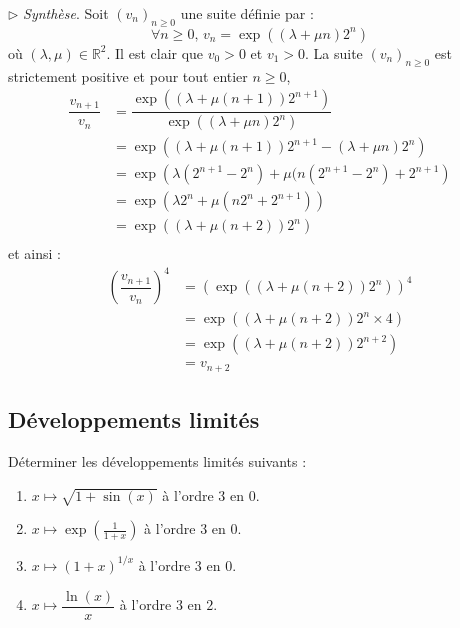 \documentclass[a4paper,twoside,french,10pt]{VcCours}
\begin{document}
\medskip

\noindent $\rhd$ \textit{Synthèse}. Soit $(v_n)_{n \geq 0}$ une suite définie par :
$$ \forall n \geq 0, \, v_n = \exp((\lambda+ \mu n)2^n)$$
où $(\lambda, \mu) \in \mathbb{R}^2$. Il est clair que $v_0>0$ et $v_1>0$. La suite $(v_n)_{n \geq 0}$ est strictement positive et pour tout entier $n \geq 0$,
\begin{align*}
\dfrac{v_{n+1}}{v_n} & = \dfrac{\exp((\lambda+ \mu (n+1))2^{n+1})}{\exp((\lambda+ \mu n)2^n)} \\
& = \exp \left( (\lambda+ \mu (n+1))2^{n+1} - (\lambda+ \mu n)2^n \right) \\
& = \exp \left( \lambda (2^{n+1}-2^n) + \mu (n(2^{n+1}-2^n) + 2^{n+1} \right) \\
& = \exp  \left( \lambda 2^n + \mu (n2^n+2^{n+1}) \right) \\
& = \exp  \left( (\lambda + \mu (n+2))2^n \right) \\
\end{align*}
et ainsi :
\begin{align*}
\left( \dfrac{v_{n+1}}{v_n}  \right)^4 & = \left(\exp  \left( (\lambda + \mu (n+2))2^n \right)\right)^4 \\
& = \exp  \left( (\lambda + \mu (n+2))2^n \times 4 \right)\\
& = \exp  \left( (\lambda + \mu (n+2))2^{n+2} \right) \\
& = v_{n+2}
\end{align*}

\medskip


\subsection{Développements limités}

\medskip



\begin{Exercice}{}
Déterminer les développements limités suivants :

\begin{multicols}{2}
\begin{enumerate}
\item $x \mapsto \sqrt{1+\sin(x)}$ à l'ordre $3$ en $0$.
\item $x \mapsto \exp \left( \frac{1}{1+x}\right)$ à l'ordre $3$ en $0$.
\item $x \mapsto (1+x)^{1/x}$ à l'ordre $3$ en $0$.
\item $x \mapsto \dfrac{\ln(x)}{x}$ à l'ordre $3$ en $2$.
\end{enumerate}
\end{multicols}

\vspace{0.1cm}
\end{Exercice} 
 
\end{document}
